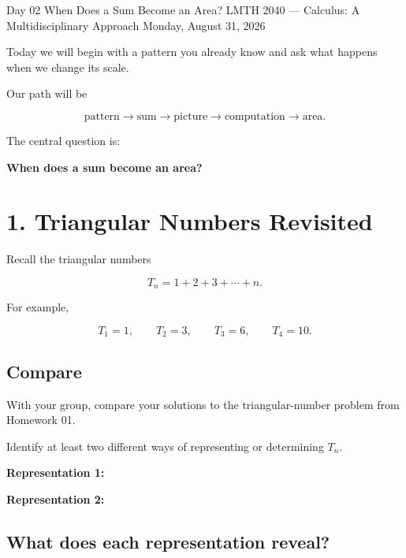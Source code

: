 \documentclass[11pt]{article}
\begin{document}
\courseheader
  {Day 02}
  {When Does a Sum Become an Area?}
  {LMTH 2040 --- Calculus: A Multidisciplinary Approach}
  {Monday, August 31, 2026}

\begin{keyidea}
Today we will begin with a pattern you already know and ask what happens
when we change its scale.

Our path will be

\[
\text{pattern}
\longrightarrow
\text{sum}
\longrightarrow
\text{picture}
\longrightarrow
\text{computation}
\longrightarrow
\text{area}.
\]

The central question is:

\begin{center}
\Large\bfseries
When does a sum become an area?
\end{center}
\end{keyidea}


\section{1. Triangular Numbers Revisited}

Recall the triangular numbers

\[
T_n = 1+2+3+\cdots+n.
\]

For example,

\[
T_1=1,
\qquad
T_2=3,
\qquad
T_3=6,
\qquad
T_4=10.
\]

\subsection*{Compare}

With your group, compare your solutions to the triangular-number
problem from Homework 01.

Identify at least two different ways of representing or determining
\(T_n\).

\vspace{0.15in}

\textbf{Representation 1:}

\vspace{0.65in}

\textbf{Representation 2:}

\vspace{0.65in}


\subsection*{What does each representation reveal?}
\end{document}
